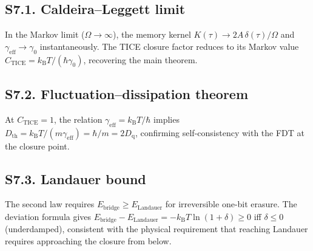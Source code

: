 \documentclass[twocolumn,showpacs,preprintnumbers,amsmath,amssymb]{revtex4-2}
\newcommand{\kB}{k_{\mathrm{B}}}
\newcommand{\Dth}{D_{\mathrm{th}}}
\newcommand{\Dq}{D_{\mathrm{q}}}
\newcommand{\geff}{\gamma_{\mathrm{eff}}}
\newcommand{\Ebr}{E_{\mathrm{bridge}}}
\newcommand{\EL}{E_{\mathrm{Landauer}}}
\newcommand{\CTICE}{C_{\mathrm{TICE}}}
\begin{document}
\subsection{S7.1. Caldeira--Leggett limit}

In the Markov limit ($\Omega \to \infty$), the memory kernel
$K(\tau) \to 2A\,\delta(\tau)/\Omega$ and $\geff \to \gamma_0$
instantaneously.  The TICE closure factor reduces to its Markov
value $\CTICE = \kB T/(\hbar\gamma_0)$, recovering the main
theorem.

\subsection{S7.2. Fluctuation--dissipation theorem}

At $\CTICE = 1$, the relation $\geff = \kB T/\hbar$ implies
$\Dth = \kB T/(m\geff) = \hbar/m = 2\Dq$, confirming
self-consistency with the FDT at the closure point.

\subsection{S7.3. Landauer bound}

The second law requires $\Ebr \geq \EL$ for irreversible
one-bit erasure.  The deviation formula gives
$\Ebr - \EL = -\kB T\ln(1+\delta) \geq 0$ iff
$\delta \leq 0$ (underdamped), consistent with the
physical requirement that reaching Landauer requires
approaching the closure from below.
\end{document}
